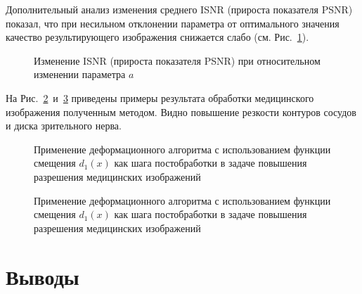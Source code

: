 Дополнительный анализ изменения среднего ISNR (прироста показателя PSNR) показал, что при несильном отклонении параметра от оптимального значения качество результирующего изображения снижается слабо (см. Рис.~\ref{fig:warping-isnr-change}).

\begin{figure}[ht]
	\caption{Изменение ISNR (прироста показателя PSNR) при относительном изменении параметра $a$}
	\label{fig:warping-isnr-change}
\end{figure}

На Рис.~\ref{fig:warping-eye}~и~\ref{fig:warping-eye2} приведены примеры результата обработки медицинского изображения полученным методом. Видно повышение резкости контуров сосудов и диска зрительного нерва.

\begin{figure}[ht]
	\caption{Применение деформационного алгоритма с использованием функции смещения $d_1\left(x\right)$ как шага постобработки в задаче повышения разрешения медицинских изображений}
	\label{fig:warping-eye}
\end{figure}

\begin{figure}[ht]
	\caption{Применение деформационного алгоритма с использованием функции смещения $d_1\left(x\right)$ как шага постобработки в задаче повышения разрешения медицинских изображений}
	\label{fig:warping-eye2}
\end{figure}

\section{Выводы} 


